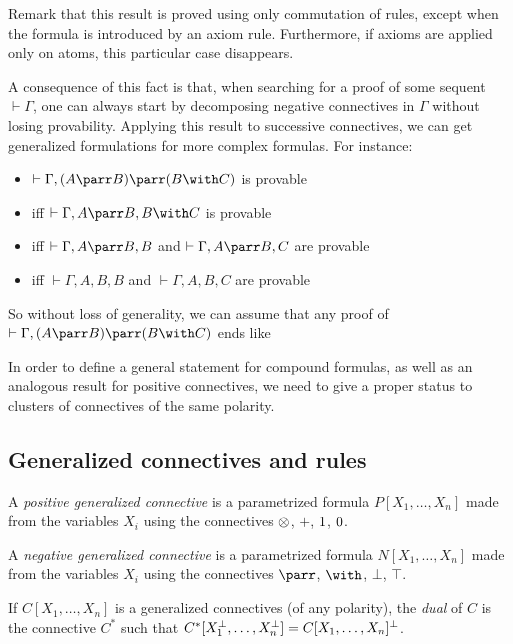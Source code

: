 Remark that this result is proved using only commutation of rules, except
when the formula is introduced by an axiom rule. Furthermore, if axioms
are applied only on atoms, this particular case disappears.

A consequence of this fact is that, when searching for a proof of some
sequent \(\vdash\Gamma\), one can always start by decomposing negative
connectives in \(\Gamma\) without losing provability. Applying this
result to successive connectives, we can get generalized formulations
for more complex formulas. For instance:
\begin{itemize}
\item
  \(\vdash\Gamma,(A\parr B)\parr(B\with C)\) is provable
\item
  iff \(\vdash\Gamma,A\parr B,B\with C\) is provable
\item
  iff \(\vdash\Gamma,A\parr B,B\) and \(\vdash\Gamma,A\parr B,C\) are
  provable
\item
  iff \(\vdash\Gamma,A,B,B\) and \(\vdash\Gamma,A,B,C\) are provable
\end{itemize}

So without loss of generality, we can assume that any proof of
\(\vdash\Gamma,(A\parr B)\parr(B\with C)\) ends like
\begin{prooftree}
\end{prooftree}

In order to define a general statement for compound formulas, as well as
an analogous result for positive connectives, we need to give a proper
status to clusters of connectives of the same polarity.

\subsection{Generalized connectives and
rules}\label{generalized-connectives-and-rules}

\begin{definition}
A \emph{positive generalized connective} is a parametrized formula
$P[X_1,\ldots,X_n]$ made from the variables $X_i$ using the connectives
$\tens$, $\plus$, $\one$, $\zero$.

A \emph{negative generalized connective} is a parametrized formula
$N[X_1,\ldots,X_n]$ made from the variables $X_i$ using the connectives
$\parr$, $\with$, $\bot$, $\top$.

If $C[X_1,\ldots,X_n]$ is a generalized connectives (of any polarity), the
\emph{dual} of $C$ is the connective $C^*$ such that
$C^*[X_1\orth,\ldots,X_n\orth]=C[X_1,\ldots,X_n]\orth$.
\end{definition}

